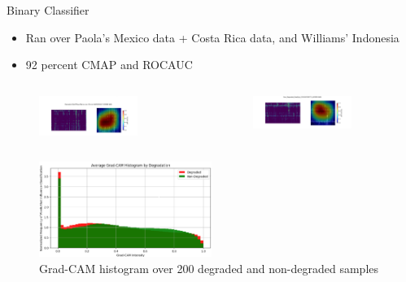 \begin{frame}{Binary Classifier}
    \begin{itemize}
        \item Ran over Paola's Mexico data + Costa Rica data, and Williams' Indonesia
        \item 92 percent CMAP and ROCAUC
    \end{itemize}
    \begin{columns}
        \begin{column}{0.5\textwidth}
            \begin{figure}
                \centering
                \includegraphics[height=0.5\textheight,width=0.75\textwidth,keepaspectratio]{images/degraded_gradcam.png}
            \end{figure}
        \end{column}
        \begin{column}{0.5\textwidth}
            \begin{figure}
                \centering
                \includegraphics[height=0.5\textheight,width=0.75\textwidth,keepaspectratio]{images/non_degraded_gradcam.png}
            \end{figure}
        \end{column}
    \end{columns}
    \begin{figure}
        \centering
        \includegraphics[height=0.3\textheight,width=0.5\textwidth,keepaspectratio]{images/gradcam_histogram.png}
        \caption{Grad-CAM histogram over 200 degraded and non-degraded samples}
    \end{figure}
\end{frame}

